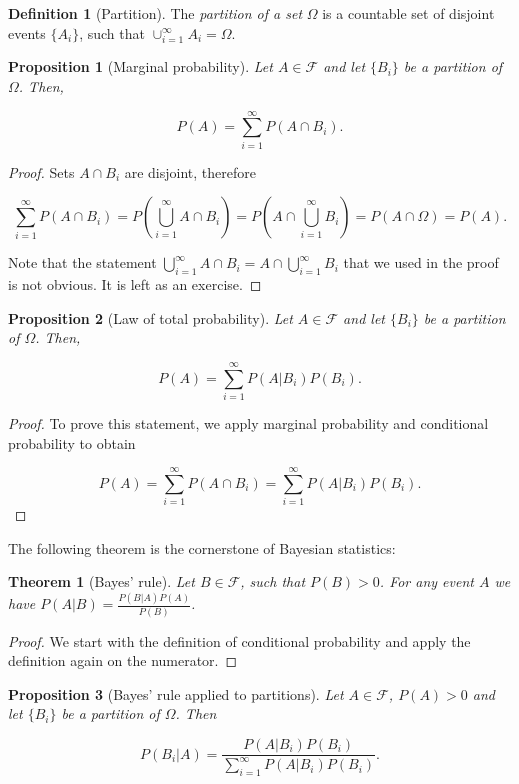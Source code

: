 \documentclass{book}
\theoremstyle{plain}%
\newtheorem{theorem}{Theorem}[section]
\newtheorem{proposition}{Proposition}[section]
\theoremstyle{definition}
\newtheorem{definition}{Definition}[section]
\begin{document}
\begin{definition}[Partition]
The \emph{partition of a set} $\Omega$ is a countable set of disjoint events $\{A_i\}$, such that $\cup_{i=1}^\infty A_i = \Omega$.
\end{definition}

\begin{proposition}[Marginal probability] Let $A \in \mathcal{F}$ and let $\{B_i\}$ be a partition of $\Omega$. Then,

$$P(A) = \sum_{i=1}^\infty P(A \cap B_i).$$
\end{proposition}

\begin{proof}
Sets $A \cap B_i$ are disjoint, therefore

$$\sum_{i=1}^\infty P(A \cap B_i) = P(\bigcup_{i=1}^\infty A \cap B_i) = P(A \cap \bigcup_{i=1}^\infty B_i) = P(A \cap \Omega) = P(A).$$

Note that the statement $\bigcup_{i=1}^\infty A \cap B_i = A \cap \bigcup_{i=1}^\infty B_i$ that we used in the proof is not obvious. It is left as an exercise.
\end{proof}

\begin{proposition}[Law of total probability] Let $A \in \mathcal{F}$ and let $\{B_i\}$ be a partition of $\Omega$. Then,

$$P(A) = \sum_{i=1}^\infty P(A|B_i)P(B_i).$$
\end{proposition}

\begin{proof}
To prove this statement, we apply marginal probability and conditional probability to obtain

$$P(A)  = \sum_{i=1}^\infty P(A \cap B_i) = \sum_{i=1}^\infty P(A|B_i)P(B_i).$$
\end{proof}

The following theorem is the cornerstone of Bayesian statistics:

\begin{theorem}[Bayes' rule] Let $B \in \mathcal{F}$, such that $P(B) > 0$. For any event $A$ we have
$P(A|B) = \frac{P(B|A)P(A)}{P(B)}$.
\end{theorem}

\begin{proof}
We start with the definition of conditional probability and apply the definition again on the numerator.
\end{proof}

\begin{proposition}[Bayes' rule applied to partitions] Let $A \in \mathcal{F}$, $P(A) > 0$ and let $\{B_i\}$ be a partition of $\Omega$. Then

$$P(B_i|A) = \frac{P(A|B_i)P(B_i)}{\sum_{i=1}^\infty P(A|B_i)P(B_i)}.$$
\end{proposition}
\end{document}
